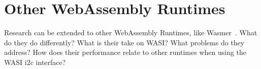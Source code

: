 \section*{Other WebAssembly Runtimes}

Research can be extended to other WebAssembly Runtimes, like Wasmer~\cite{wasmer_git}. What do they do differently? What is their take on WASI? What problems do they address? How does their performance relate to other runtimes when using the WASI \acrshort{i2c} interface?